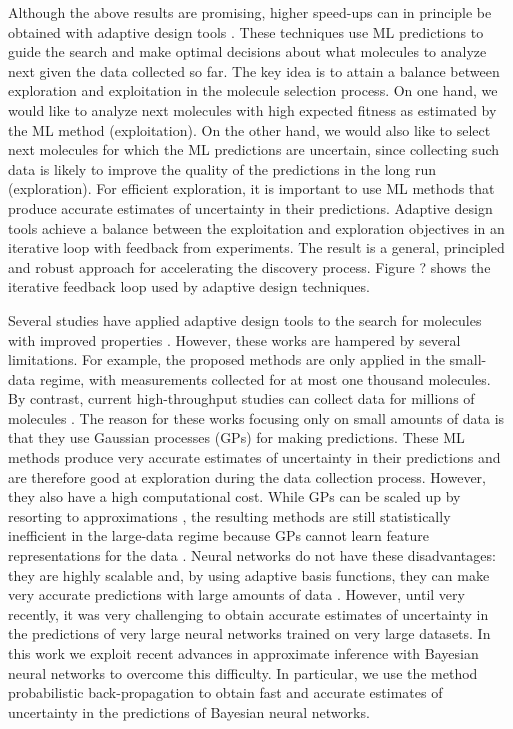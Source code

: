 Although the above results are promising, higher speed-ups can in principle be
obtained with adaptive design tools \cite{jones1998efficient}. These techniques
use ML predictions to guide the search and make optimal decisions about what
molecules to analyze next given the data collected so far. The key idea is to
attain a balance between exploration and exploitation in the molecule selection
process. On one hand, we would like to analyze next molecules with high
expected fitness as estimated by the ML method (exploitation). On the other
hand, we would also like to select next molecules for which the ML predictions
are uncertain, since collecting such data is likely to improve the quality of
the predictions in the long run (exploration). For efficient
exploration, it is important to use ML methods that produce accurate
estimates of uncertainty in their predictions. 
Adaptive design tools achieve a balance
between the exploitation and exploration objectives in an iterative loop with
feedback from experiments. 
The result is a general, principled and robust
approach for accelerating the discovery process. 
Figure ? shows the iterative
feedback loop used by adaptive design techniques.

Several studies have applied adaptive design tools to the search for
molecules with improved properties \cite{Xue_2016,Negoescu_2011,De_Grave_2008}. However, these
works are hampered by several limitations. For example, the proposed methods are only
applied in the small-data regime, with measurements collected for at most one
thousand molecules. By contrast, current high-throughput studies can collect data for
millions of molecules \cite{Hachmann_2011}. The reason for these works focusing only on
small amounts of data is that they 
use Gaussian processes (GPs) \cite{rasmussen2006gaussian} for making predictions. These ML methods
produce very accurate estimates of uncertainty in their predictions and are therefore 
good at exploration during the data collection process.
However, they also have a high computational
cost. While GPs can be scaled up by resorting to approximations 
\cite{snelson2005sparse,hensman2015scalable}, the resulting methods are still
statistically inefficient in the large-data regime because GPs cannot learn
feature representations for the data \cite{bengio2007scaling}.
Neural networks do not have these disadvantages: they are highly scalable and,
by using adaptive basis functions, they can make very accurate predictions with
large amounts of data \cite{lecun2015deep}. However, until very recently, it was very
challenging to obtain accurate estimates of uncertainty in the predictions of very large
neural networks trained on very large datasets. In this work we exploit
recent advances in approximate inference with Bayesian neural networks to overcome this difficulty. 
In particular, we use the method probabilistic back-propagation \cite{Hernandez-Lobato15b} to obtain fast
and accurate estimates of uncertainty in the predictions of Bayesian neural networks.


